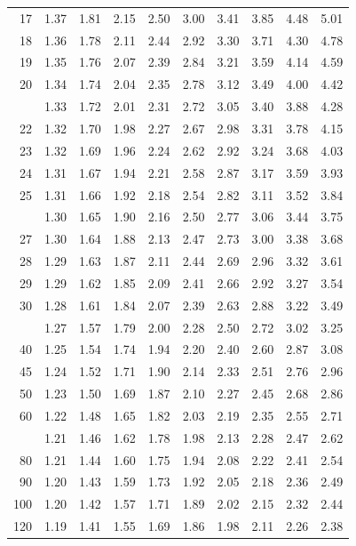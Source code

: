 \documentclass[10pt]{article}
\begin{document}
\begin{longtable}{@{}r!{\vrule width 0.8pt\hspace{0.55em}}rrrrrrrrr@{}}
17 & 1.37 & 1.81 & 2.15 & 2.50 & 3.00 & 3.41 & 3.85 & 4.48 & 5.01 \\
18 & 1.36 & 1.78 & 2.11 & 2.44 & 2.92 & 3.30 & 3.71 & 4.30 & 4.78 \\
19 & 1.35 & 1.76 & 2.07 & 2.39 & 2.84 & 3.21 & 3.59 & 4.14 & 4.59 \\
20 & 1.34 & 1.74 & 2.04 & 2.35 & 2.78 & 3.12 & 3.49 & 4.00 & 4.42 \\
 & 1.33 & 1.72 & 2.01 & 2.31 & 2.72 & 3.05 & 3.40 & 3.88 & 4.28 \\
22 & 1.32 & 1.70 & 1.98 & 2.27 & 2.67 & 2.98 & 3.31 & 3.78 & 4.15 \\
23 & 1.32 & 1.69 & 1.96 & 2.24 & 2.62 & 2.92 & 3.24 & 3.68 & 4.03 \\
24 & 1.31 & 1.67 & 1.94 & 2.21 & 2.58 & 2.87 & 3.17 & 3.59 & 3.93 \\
25 & 1.31 & 1.66 & 1.92 & 2.18 & 2.54 & 2.82 & 3.11 & 3.52 & 3.84 \\
 & 1.30 & 1.65 & 1.90 & 2.16 & 2.50 & 2.77 & 3.06 & 3.44 & 3.75 \\
27 & 1.30 & 1.64 & 1.88 & 2.13 & 2.47 & 2.73 & 3.00 & 3.38 & 3.68 \\
28 & 1.29 & 1.63 & 1.87 & 2.11 & 2.44 & 2.69 & 2.96 & 3.32 & 3.61 \\
29 & 1.29 & 1.62 & 1.85 & 2.09 & 2.41 & 2.66 & 2.92 & 3.27 & 3.54 \\
30 & 1.28 & 1.61 & 1.84 & 2.07 & 2.39 & 2.63 & 2.88 & 3.22 & 3.49 \\
 & 1.27 & 1.57 & 1.79 & 2.00 & 2.28 & 2.50 & 2.72 & 3.02 & 3.25 \\
40 & 1.25 & 1.54 & 1.74 & 1.94 & 2.20 & 2.40 & 2.60 & 2.87 & 3.08 \\
45 & 1.24 & 1.52 & 1.71 & 1.90 & 2.14 & 2.33 & 2.51 & 2.76 & 2.96 \\
50 & 1.23 & 1.50 & 1.69 & 1.87 & 2.10 & 2.27 & 2.45 & 2.68 & 2.86 \\
60 & 1.22 & 1.48 & 1.65 & 1.82 & 2.03 & 2.19 & 2.35 & 2.55 & 2.71 \\
 & 1.21 & 1.46 & 1.62 & 1.78 & 1.98 & 2.13 & 2.28 & 2.47 & 2.62 \\
80 & 1.21 & 1.44 & 1.60 & 1.75 & 1.94 & 2.08 & 2.22 & 2.41 & 2.54 \\
90 & 1.20 & 1.43 & 1.59 & 1.73 & 1.92 & 2.05 & 2.18 & 2.36 & 2.49 \\
100 & 1.20 & 1.42 & 1.57 & 1.71 & 1.89 & 2.02 & 2.15 & 2.32 & 2.44 \\
120 & 1.19 & 1.41 & 1.55 & 1.69 & 1.86 & 1.98 & 2.11 & 2.26 & 2.38 \\

\end{longtable}
\end{document}
